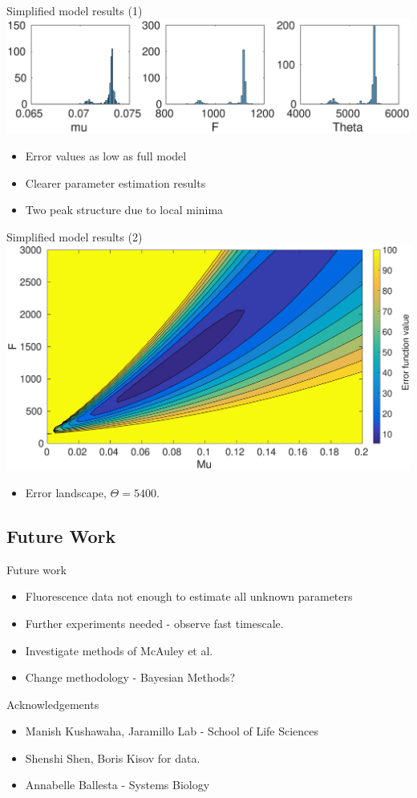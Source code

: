 \documentclass{beamer}
\begin{document}
\begin{frame}{Simplified model results (1)}
  \includegraphics[scale = 0.29, clip = true, trim = 100 0 0 400]{Figures/13_9_hist_simplified}
  \begin{itemize}
\item  Error values as low as full model
\item Clearer parameter estimation results
\item Two peak structure due to local minima
\end{itemize}
\end{frame}

\begin{frame}{Simplified model results (2)}
  \includegraphics[scale = 0.26, clip = true, trim = 40 0 0 0]{Figures/Likelihood_rough_presentation}
    \begin{itemize}
\item  Error landscape, $\Theta = 5400$.
\end{itemize}
\end{frame}

\subsection{Future Work}


\begin{frame}{Future work}
  \begin{itemize}
  \item Fluorescence data \alert {not enough} to estimate all unknown parameters 
  \item Further experiments needed - observe fast timescale.
  \item Investigate methods of McAuley et al. 
  \item Change methodology - Bayesian Methods?
  \end{itemize}
  \end{frame}
  
  \begin{frame}{Acknowledgements}
  \begin{itemize}
  \item Manish Kushawaha, Jaramillo Lab - School of Life Sciences
  \item Shenshi Shen, Boris Kisov for data.
  \item Annabelle Ballesta - Systems Biology
  \end{itemize}
  \end{frame}
  
\end{document}
